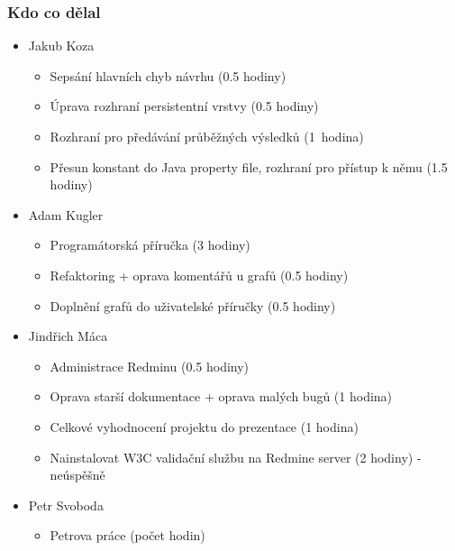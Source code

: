 \documentclass{beamer}
\begin{document}
\begin{frame}[allowframebreaks]\frametitle{Kdo co dělal} 
  \begin{itemize}
    \item Jakub Koza
      \begin{itemize}
       \item Sepsání hlavních chyb návrhu (0.5 hodiny)
	   \item Úprava rozhraní persistentní vrstvy (0.5 hodiny)
	   \item Rozhraní pro předávání průběžných výsledků 
(1~hodina)
       \item Přesun konstant do Java property file, rozhraní pro přístup k němu (1.5 hodiny)
     \end{itemize}

    \item Adam Kugler
      \begin{itemize}
       \item Programátorská příručka (3 hodiny)
       \item Refaktoring + oprava komentářů u grafů (0.5 hodiny)
       \item Doplnění grafů do uživatelské příručky (0.5 hodiny)
     \end{itemize}

    \item Jindřich Máca
      \begin{itemize}
       \item Administrace Redminu	(0.5 hodiny)	
			 \item Oprava starší dokumentace + oprava malých bugů (1 hodina)
			 \item Celkové vyhodnocení projektu do prezentace (1 hodina)
			 \item Nainstalovat W3C validační službu na Redmine server (2 hodiny) - neúspěšně
     \end{itemize}

    \item Petr Svoboda
      \begin{itemize}
       \item Petrova práce (počet hodin)
     \end{itemize}
   \end{itemize}  
\end{frame} 

\end{document}
